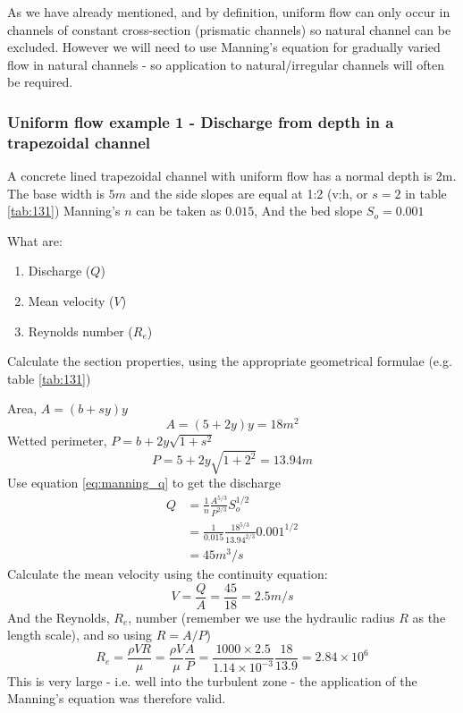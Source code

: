 \documentclass[a4paper, 12pt, british]{article} %
\numberwithin{equation}{section}
\numberwithin{figure}{section}
\numberwithin{table}{section}
\begin{document}
As we have already mentioned, and by definition, uniform flow can only occur in channels of constant cross-section (prismatic channels) so natural channel can be excluded. However we will need to use Manning's equation for gradually varied flow in natural channels - so application to natural/irregular channels will often be required.

\subsubsection{Uniform flow example 1 - Discharge from depth in a trapezoidal channel}

A concrete lined trapezoidal channel with uniform flow has a normal depth is 2m. 
The base width is $5m$ and the side slopes are equal at 1:2 (v:h, or $s=2$ in table \ref{tab:131})
Manning's $n$ can be taken as $0.015$, 
And the bed slope $S_o = 0.001$

What are:
\begin{enumerate}[label=\alph*]
	\item Discharge ($Q$)
	\item Mean velocity ($V$)
	\item Reynolds number ($R_e$)
\end{enumerate}
Calculate the section properties, using the appropriate geometrical formulae (e.g. table \ref{tab:131})

Area, $A =(b+sy)y$  
\begin{equation*}
A= (5 + 2y)y = 18m^2
\end{equation*}
Wetted perimeter, $P =b+2y\sqrt{1+s^2}$
\begin{equation*}
P= 5 + 2y\sqrt{1+2^2} = 13.94m
\end{equation*}
Use equation \ref{eq:manning_q} to get the discharge
\begin{align*}
Q &= \frac{1}{n}\frac{A^{5/3}}{P^{2/3}}S_o^{1/2} \\
&= \frac{1}{0.015}\frac{18^{5/3}}{13.94^{2/3}}0.001^{1/2}\\
& = 45 m^3/s
\end{align*}
Calculate the mean velocity using the continuity equation:
\begin{equation*}
V= \frac{Q}{A}=\frac{45}{18}=2.5 m/s
\end{equation*}
And the Reynolds, $R_e$, number (remember we use the hydraulic radius $R$  as the length scale), and so using $R=A/P$)
\begin{equation*}
R_e = \frac{\rho V R}{\mu} = \frac{\rho V}{\mu}\frac{A}{P} =\frac{1000 \times 2.5}{1.14\times 10^{-3} }\frac{18}{13.9} = 2.84 \times 10^6
\end{equation*}
This is very large - i.e. well into the turbulent zone - the application of the Manning's equation was therefore valid. 
\end{document}
